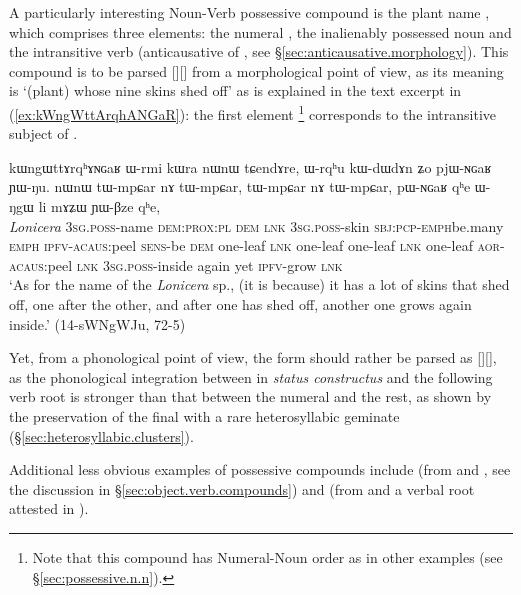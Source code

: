 A particularly interesting Noun-Verb possessive compound is the  plant name , which comprises three elements: the numeral , the inalienably possessed noun  and the intransitive verb  (anticausative of , see §\ref{sec:anticausative.morphology}). This compound is to be parsed [][] from a morphological point of view, as its meaning is `(plant) whose nine skins shed off' as is explained in the text excerpt in (\ref{ex:kWngWttArqhANGaR}): the first element \footnote{Note that this compound has Numeral-Noun order as in other examples (see §\ref{sec:possessive.n.n}).} corresponds to the intransitive subject of . 

\begin{exe}
\ex \label{ex:kWngWttArqhANGaR}
\gll kɯngɯttɤrqʰɤɴɢaʁ ɯ-rmi kɯra nɯnɯ tɕendɤre, ɯ-rqʰu kɯ-dɯ\redp{}dɤn ʑo pjɯ-ɴɢaʁ ɲɯ-ŋu. nɯnɯ tɯ-mpɕar nɤ tɯ-mpɕar, tɯ-mpɕar nɤ tɯ-mpɕar, pɯ-ɴɢaʁ qʰe ɯ-ŋgɯ li mɤʑɯ ɲɯ-βze qʰe, \\
\textit{Lonicera} \textsc{3sg}.\textsc{poss}-name \textsc{dem}:\textsc{prox:pl} \textsc{dem} \textsc{lnk} \textsc{3sg}.\textsc{poss}-skin \textsc{sbj}:\textsc{pcp}-\textsc{emph}\redp{}be.many \textsc{emph} \textsc{ipfv}-\textsc{acaus}:peel \textsc{sens}-be \textsc{dem} one-leaf \textsc{lnk}  one-leaf  one-leaf \textsc{lnk}  one-leaf \textsc{aor}-\textsc{acaus}:peel \textsc{lnk} \textsc{3sg}.\textsc{poss}-inside again yet \textsc{ipfv}-grow \textsc{lnk}  \\
\glt `As for the name of the \textit{Lonicera} sp., (it is because) it has a lot of skins that shed off, one after the other, and after one has shed off, another one grows again inside.' (14-sWNgWJu, 72-5)
\end{exe}

Yet, from a phonological point of view, the form should rather be parsed as [][], as the phonological integration between  in \textit{status constructus} and the following verb root is stronger than that between the numeral  and the rest, as shown by the preservation of the final  with a rare heterosyllabic geminate (§\ref{sec:heterosyllabic.clusters}).

Additional less obvious examples of possessive compounds include  (from  and , see the discussion in §\ref{sec:object.verb.compounds}) and   (from  and a verbal root   attested in ).  

